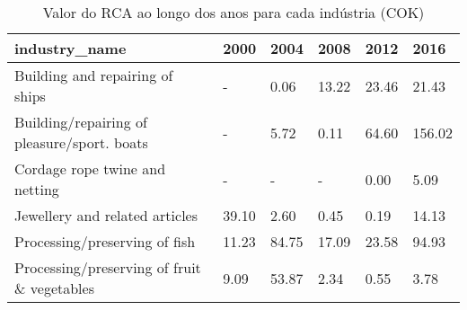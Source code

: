 \begin{table}
\centering
\caption{Valor do RCA ao longo dos anos para cada indústria (COK)}
\begin{tabular}{p{6cm}p{1.5cm}p{1.5cm}p{1.5cm}p{1.5cm}p{1.5cm}}
\toprule
                              industry\_name &  2000 &  2004 &  2008 &  2012 &   2016 \\
\midrule
            Building and repairing of ships &     - &  0.06 & 13.22 & 23.46 &  21.43 \\
Building/repairing of pleasure/sport. boats &     - &  5.72 &  0.11 & 64.60 & 156.02 \\
             Cordage rope twine and netting &     - &     - &     - &  0.00 &   5.09 \\
             Jewellery and related articles & 39.10 &  2.60 &  0.45 &  0.19 &  14.13 \\
              Processing/preserving of fish & 11.23 & 84.75 & 17.09 & 23.58 &  94.93 \\
Processing/preserving of fruit \& vegetables &  9.09 & 53.87 &  2.34 &  0.55 &   3.78 \\
\bottomrule
\end{tabular}
\end{table}
